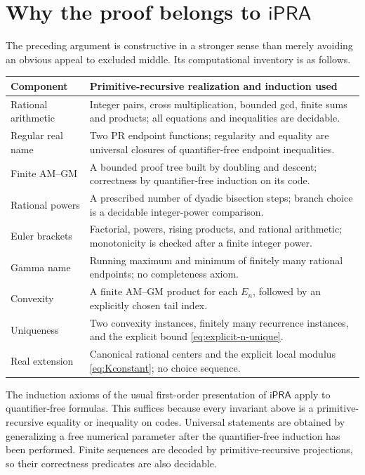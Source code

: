 \documentclass[11pt]{article}
\newcommand{\ipra}{\mathsf{iPRA}}
\begin{document}
\section{Why the proof belongs to \texorpdfstring{$\ipra$}{iPRA}}
\label{sec:ipra-audit}

The preceding argument is constructive in a stronger sense than merely
avoiding an obvious appeal to excluded middle.  Its computational inventory
is as follows.

\begin{longtable}{>{\raggedright\arraybackslash}p{}
                  >{\raggedright\arraybackslash}p{}}
\toprule
Component & Primitive-recursive realization and induction used \\
\midrule
\endhead
Rational arithmetic & Integer pairs, cross multiplication, bounded gcd,
finite sums and products; all equations and inequalities are decidable.\\
Regular real name & Two PR endpoint functions; regularity and equality are
universal closures of quantifier-free endpoint inequalities.\\
Finite AM--GM & A bounded proof tree built by doubling and descent; correctness
by quantifier-free induction on its code.\\
Rational powers & A prescribed number of dyadic bisection steps; branch choice
is a decidable integer-power comparison.\\
Euler brackets & Factorial, powers, rising products, and rational arithmetic;
monotonicity is checked after a finite integer power.\\
Gamma name & Running maximum and minimum of finitely many rational endpoints;
no completeness axiom.\\
Convexity & A finite AM--GM product for each $E_n$, followed by an explicitly
chosen tail index.\\
Uniqueness & Two convexity instances, finitely many recurrence instances, and
the explicit bound \eqref{eq:explicit-n-unique}.\\
Real extension & Canonical rational centers and the explicit local modulus
\eqref{eq:Kconstant}; no choice sequence.\\
\bottomrule
\end{longtable}

The induction axioms of the usual first-order presentation of $\ipra$ apply to
quantifier-free formulas.  This suffices because every invariant above is a
primitive-recursive equality or inequality on codes.  Universal statements
are obtained by generalizing a free numerical parameter after the
quantifier-free induction has been performed.  Finite sequences are decoded
by primitive-recursive projections, so their correctness predicates are also
decidable.
\end{document}
